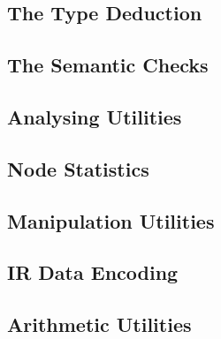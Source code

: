 \subsection{The Type Deduction}
\label{sec:Compiler.Core.TypeDeduction}
\subsection{The Semantic Checks}
\label{sec:Compiler.Core.SemanticChecks}
\subsection{Analysing Utilities}
\label{sec:Compiler.Core.Analysis}
\subsection{Node Statistics}
\label{sec:Compiler.Core.Statistics}
\subsection{Manipulation Utilities}
\label{sec:Compiler.Core.Manipulation}
\subsection{IR Data Encoding}
\label{sec:Compiler.Core.Encoding}
\subsection{Arithmetic Utilities}
\label{sec:Compiler.Core.Arithmetic}
